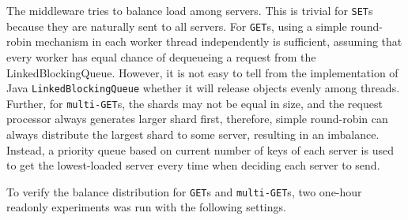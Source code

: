 The middleware tries to balance load among servers. This is trivial for \texttt{SET}s because they are naturally sent to all servers. For \texttt{GET}s, using a simple round-robin mechanism in each worker thread independently is sufficient, assuming that every worker has equal chance of dequeueing a request from the LinkedBlockingQueue. However, it is not easy to tell from the implementation of Java \texttt{LinkedBlockingQueue} whether it will release objects evenly among threads. Further, for \texttt{multi-GET}s, the shards may not be equal in size, and the request processor always generates larger shard first, therefore, simple round-robin can always distribute the largest shard to some server, resulting in an imbalance. Instead, a priority queue based on current number of keys of each server is used to get the lowest-loaded server every time when deciding each server to send.

To verify the balance distribution for \texttt{GET}s and \texttt{multi-GET}s, two one-hour readonly experiments was run with the following settings.


